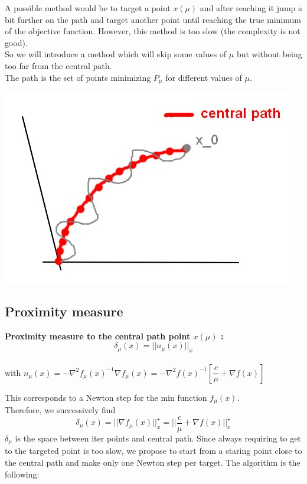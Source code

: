 A possible method would be to target a point $x(\mu)$ and after reaching it jump a bit further on the path and target another point until reaching the true minimum of the objective function. However, this method is too slow (the complexity is not good).\\
So we will introduce a method which will skip some values of $\mu$ but without being too far from the central path.\\
The path is the set of points minimizing $P_\mu$ for different values of $\mu$.
\begin{center}
\includegraphics[scale=0.3]{images/12-fig2.jpg} 
\end{center}

\subsection{Proximity measure}
\begin{definition} \textbf{Proximity measure to the central path point $x(\mu)$ :}\\ $$ \delta_{\mu}(x) = || n_{\mu}(x) ||_x $$\\
 with $n_{\mu}(x) = - \nabla^2 f_{\mu}(x)^{-1} \nabla f_{\mu}(x) = - \nabla^2 f(x)^{-1} [\dfrac{c}{\mu} + \nabla f(x)]$\\
\end{definition}

 This corresponds to a Newton step for the min function $f_{\mu}(x)$.\\ Therefore, we successively find
$$\delta_{\mu}(x) = || \nabla f_{\mu}(x) ||_x^{\star} = || \dfrac{c}{\mu} + \nabla f(x) ||_x^{\star}$$
$\delta_{\mu}$ is the space between iter points and central path. Since always requiring to get to the targeted point is too slow, we propose to start from a staring point close to the central path and make only one Newton step per target. The algorithm is the following:\\

